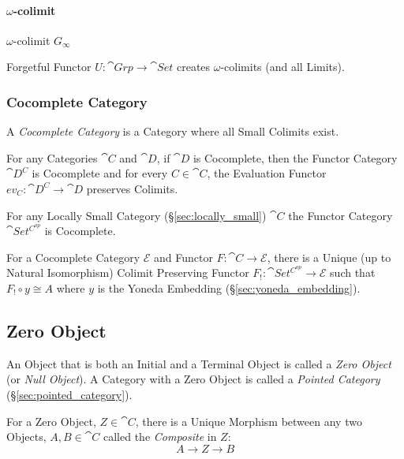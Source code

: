 \paragraph{$\omega$-colimit}\label{sec:omega_colimit}\hfill

$\omega$-colimit $G_\infty$

Forgetful Functor $U : \cat{Grp} \rightarrow \cat{Set}$ creates
$\omega$-colimits (and all Limits). \cite{awodey06}



\subsubsection{Cocomplete Category}\label{sec:cocomplete_category}

A \emph{Cocomplete Category} is a Category where all Small Colimits
exist.

For any Categories $\cat{C}$ and $\cat{D}$, if $\cat{D}$ is
Cocomplete, then the Functor Category $\cat{D^C}$ is Cocomplete and
for every $C \in \cat{C}$, the Evaluation Functor $ev_C :
\cat{D^C} \rightarrow \cat{D}$ preserves Colimits.

For any Locally Small Category (\S\ref{sec:locally_small})
$\cat{C}$ the Functor Category $\cat{Set^{C^{op}}}$ is
Cocomplete.

For a Cocomplete Category $\mathcal{E}$ and Functor $F : \cat{C}
\rightarrow \mathcal{E}$, there is a Unique (up to Natural
Isomorphism) Colimit Preserving Functor $F_! : \cat{Set^{C^{op}}}
\rightarrow \mathcal{E}$ such that $F_! \circ y \cong A$ where $y$ is
the Yoneda Embedding (\S\ref{sec:yoneda_embedding}).\cite{awodey06}



\subsection{Zero Object}\label{sec:zero_object}

An Object that is both an Initial and a Terminal Object is called a
\emph{Zero Object} (or \emph{Null Object}). A Category with a Zero
Object is called a \emph{Pointed Category}
(\S\ref{sec:pointed_category}).

For a Zero Object, $Z \in \cat{C}$, there is a Unique Morphism
between any two Objects, $A, B \in \cat{C}$ called the
\emph{Composite} in $Z$:
\[
  A \rightarrow Z \rightarrow B
\]

